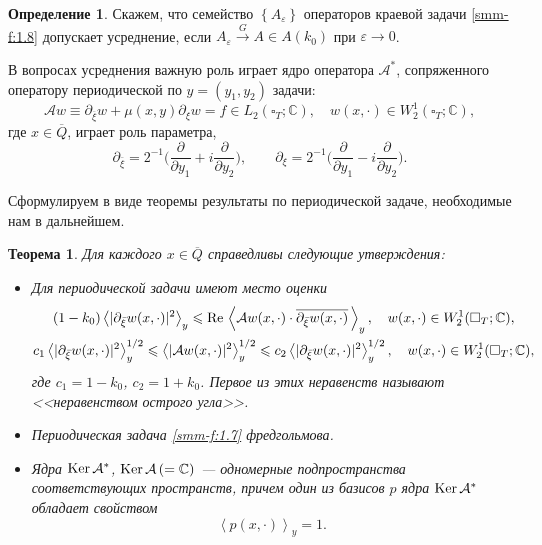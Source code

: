 \documentclass[a4paper,12pt]{article}
\newtheorem{theorem}{Теорема}[section]
\theoremstyle{definition}
\newtheorem{definition}{Определение}[section]
\begin{document}
\begin{definition}
	Скажем, что семейство $\left\{ A_\varepsilon \right\}$ операторов
краевой задачи \eqref{smm-f:1.8}  допускает усреднение, если $A_\varepsilon \overset{G}{\longrightarrow}A\in A(k_0) $ при
$\varepsilon\to 0$.
\end{definition}

	В вопросах усреднения важную роль играет ядро оператора $\mathcal{A}^*$, сопряженного оператору периодической по $y=(y_1,y_2)$ задачи:
	\begin{equation}\label{smm-f:1.7}
		\mathcal{A}w\equiv \partial_{\overline{\xi}}w +\mu(x,y) \partial_{\xi}w =f\in L_2(\square_T;\mathbb{C}),\quad
		w(x,\cdot)\in W_2^1(\square_T;\mathbb{C}),
	\end{equation}
	где $x\in \overline Q$, играет роль параметра,
	$$
	\partial_{\bar \xi}=2^{-1}\Big(\frac{\partial}{\partial y_1}+i\frac{\partial}{\partial y_2}\Big),\qquad  \partial_{\xi}=2^{-1}\Big(\frac{\partial}{\partial y_1}-i\frac{\partial}{\partial y_2}\Big).
	$$
	
	Сформулируем в виде теоремы результаты по периодической задаче, необходимые нам в дальнейшем.
	
	
\begin{theorem}
Для каждого $x\in\overline Q$ справедливы следующие утверждения:
\begin{itemize}
\item  Для периодической задачи имеют место оценки
\begin{gather*}
	(1-k_0)\left<|\partial_{\bar{\xi}}w(x,\cdot)|^2\right>_y\leqslant \text{\rm Re\,}\left<\mathcal{A}w(x,\cdot)\cdot \overline{\partial_{\bar{\xi}}w(x,\cdot)}\,\right>_y,\quad  w(x,\cdot)\in W_2^1(\square_T;\mathbb{C}),\\
	c_1\left<|\partial_{\bar{\xi}}w(x,\cdot)|^2\right>_y^{1/2}\leqslant
	\left<|\mathcal{A}w(x,\cdot)|^2\right>_y^{1/2}\leqslant c_2\left<|\partial_{\bar{\xi}}w(x,\cdot)|^2\right>_y^{1/2}, \quad  w(x,\cdot)\in W_2^1(\square_T;\mathbb{C}),
\end{gather*}
где $c_1=1-k_0$, $c_2=1+k_0$. Первое из этих неравенств называют <<неравенством острого угла>>.
\item  Периодическая задача \eqref{smm-f:1.7} фредгольмова.
\item Ядра  $\text{\rm Ker\,}\mathcal{A}^\ast$, $\text{\rm Ker\,}\mathcal{A}\,(=\mathbb{C})$
	--- одномерные подпространства соответствующих пространств,
	причем один из базисов $p$ ядра
	$\text{\rm Ker\,}\mathcal{A}^\ast$ обладает свойством
	\begin{equation}\label{smm-df:1.10}
 \left< p(x,\cdot)\right>_y=1.
	\end{equation}
\end{itemize}
\end{theorem}
\end{document}
